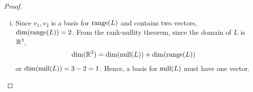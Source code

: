 \begin{proof}
\begin{enumerate}[(i)]
        To show that $v_1=L(e_1)$ and $v_2=L(e_2)$, we have 
        \[
            \begin{aligned}
                L(e_1)=1v_1+0v_2+0v_3=v_1
            \end{aligned}
        \]
        and 
        \[
            \begin{aligned}
                L(e_2)=0v_1+1v_2+0v_3=v_2
            \end{aligned}
        \]
        Therefore, $[L(e_1),L(e_2)]=[v_1,v_2]$, or $[L(e_1),L(e_2)]$ is a basis for $\range(L)$\qed
        \item 
        Since $v_1,v_2$ is a basis for $\range(L)$ and contains two vectors, $\textnormal{dim}(\textnormal{range}(L))=2$.
        From the rank-nullity theorem, since the domain of $L$ is $\mathbb R^3$, 
        \[
            \begin{aligned}
                \textnormal{dim}(\mathbb R^3)=\textnormal{dim}(\textnormal{null}(L))+\textnormal{dim}(\textnormal{range}(L))
            \end{aligned}
        \]
        or $\textnormal{dim}(\textnormal{null}(L))=3-2=1$. Hence, a basis for $\textnormal{null}(L)$ must have one vector.


\end{enumerate}
\end{proof}
